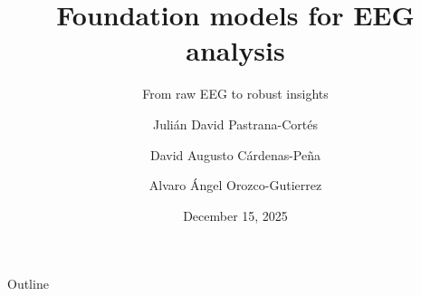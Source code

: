 \documentclass[aspectratio=169]{beamer}
\title[Foundation models for EEG analysis]{Foundation models for EEG analysis}
\subtitle{From raw EEG to robust insights}
\author{Julián David Pastrana-Cortés \and David Augusto Cárdenas-Peña \and Alvaro Ángel Orozco-Gutierrez}
\institute{Universidad Tecnológica de Pereira}
\date{December 15, 2025}
\begin{document}
\maketitle

\begin{frame}{Outline}
    \vfill
    \tableofcontents[hideallsubsections]
    \vfill
\end{frame}





% 



\end{document}
